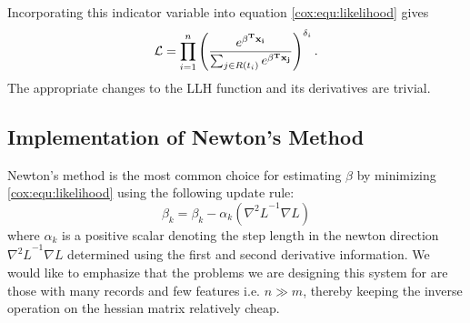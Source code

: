 \documentclass[12pt]{article}
\begin{document}
Incorporating this indicator variable into equation \ref{cox:equ:likelihood} gives
\begin{equation}\label{cox:equ:likelihood-censoring}
\mathcal{L} = \prod_{i = 1}^n \left(  \frac{e^{\bold{\beta^T x_i} }}{ \sum_{j \in R(t_i)} e^{\bold{\beta^T x_j}}} \right)^{\delta_i}.
\end{equation}
The appropriate changes to the LLH function and its derivatives are trivial.   


\subsection{Implementation of Newton's Method}
Newton's method is the most common choice for estimating $\beta$ by minimizing \ref{cox:equ:likelihood} using the following update rule:
\begin{equation}
\beta_{k} = \beta_{k} - \alpha_k \left( {\nabla^2 L}^{-1} \nabla L \right)
\end{equation}
where $\alpha_k$ is a positive scalar denoting the step length in the newton direction ${\nabla^2 L}^{-1} \nabla L$ determined using the first and second derivative information. We would like to emphasize that the problems we are designing this system for are those with many records and few features i.e. $n \gg m$, thereby keeping the inverse operation on the hessian matrix relatively cheap.
\end{document}
